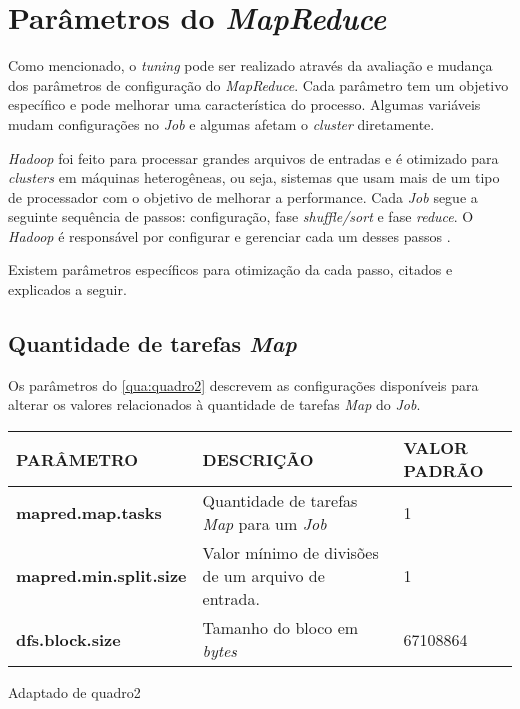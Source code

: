 \section{Parâmetros do \textit{MapReduce}} \label{sec:parametrosmapreduce}

Como mencionado, o \textit{tuning} pode ser realizado através da avaliação e mudança dos parâmetros de configuração do \textit{MapReduce}. Cada parâmetro tem um objetivo específico e pode melhorar uma característica do processo. Algumas variáveis mudam configurações no \textit{Job} e algumas afetam o \textit{cluster} diretamente.

\textit{Hadoop} foi feito para processar grandes arquivos de entradas e é otimizado para \textit{clusters} em máquinas heterogêneas, ou seja, sistemas que usam mais de um tipo de processador com o objetivo de melhorar a performance. Cada \textit{Job} segue a seguinte sequência de passos: configuração, fase \textit{shuffle/sort} e fase \textit{reduce}. O \textit{Hadoop} é responsável por configurar e gerenciar cada um desses passos \cite{ProHadoop09}.

Existem parâmetros específicos para otimização da cada passo, citados e explicados a seguir.

\subsection{Quantidade de tarefas \textit{Map}}\label{ssec:usomemoria}

Os parâmetros do \autoref{qua:quadro2} descrevem as configurações disponíveis para alterar os valores relacionados à quantidade de tarefas \textit{Map} do \textit{Job}.

{\footnotesize
  \centering
  \begin{tabular}{|p{35mm}|p{50mm}|p{30mm}|}\hline
    \textbf{PARÂMETRO}             & \textbf{DESCRIÇÃO}                                      & \textbf{VALOR PADRÃO} \\\hline
    \textbf{mapred.map.tasks}      & Quantidade de tarefas \textit{Map} para um \textit{Job} & 1                     \\\hline
    \textbf{mapred.min.split.size} & Valor mínimo de divisões de um arquivo de entrada.      & 1                     \\\hline
    \textbf{dfs.block.size}        & Tamanho do bloco em \textit{bytes}                      & 67108864              \\\hline
  \end{tabular}}
{Adaptado de \cite{ProHadoop09}}{quadro2}{}{}


